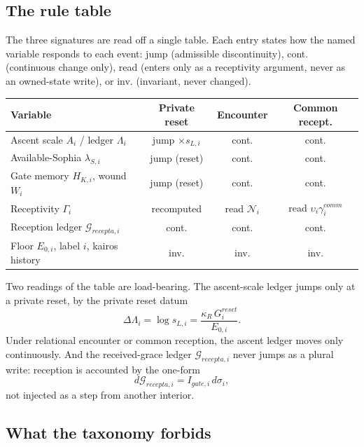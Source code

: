 \documentclass[11pt,a4paper]{article}
\def\mathrm#1{#1}%
\def\emph#1{#1}%
\renewcommand{\arraystretch}{1.25}
\theoremstyle{definition}
\theoremstyle{plain}
\theoremstyle{remark}
\begin{document}
\subsection{The rule table}

The three signatures are read off a single table. Each entry states how the named variable
responds to each event: \emph{jump} (admissible discontinuity), \emph{cont.} (continuous
change only), \emph{read} (enters only as a receptivity argument, never as an owned-state
write), or \emph{inv.} (invariant, never changed).

\begin{center}
\renewcommand{\arraystretch}{1.3}
\setlength{\tabcolsep}{5pt}
\footnotesize
\begin{tabular}{@{}l c c c@{}}
\hline
\textbf{Variable} & \textbf{Private reset} & \textbf{Encounter} & \textbf{Common recept.}\\
\hline
Ascent scale \(A_i\) / ledger \(\Lambda_i\)
& jump \(\times s_{L,i}\) & cont. & cont.\\
Available-Sophia \(\lambda_{S,i}\)
& jump (reset) & cont. & cont.\\
Gate memory \(H_{K,i}\), wound \(W_i\)
& jump (reset) & cont. & cont.\\
Receptivity \(\Gamma_i\)
& recomputed & read \(\mathcal N_i\) & read \(\upsilon_i\gamma_i^{\mathrm{comm}}\)\\
Reception ledger \(\mathcal G_{\mathrm{recepta},i}\)
& cont. & cont. & cont.\\
Floor \(E_{0,i}\), label \(i\), kairos history
& inv. & inv. & inv.\\
\hline
\end{tabular}
\end{center}

\noindent Two readings of the table are load-bearing. The ascent-scale ledger
jumps only at a private reset, by the private reset datum
\[
\Delta\Lambda_i=\log s_{L,i}
=
\frac{\kappa_R\,G_i^{\mathrm{reset}}}{E_{0,i}}.
\]
Under relational encounter or common reception, the ascent ledger moves only
continuously. And the received-grace ledger
\(\mathcal G_{\mathrm{recepta},i}\) never jumps as a plural write: reception is
accounted by the one-form
\[
d\mathcal G_{\mathrm{recepta},i}
=
I_{\mathrm{gate},i}\,d\sigma_i,
\]
not injected as a step from another interior.

\subsection{What the taxonomy forbids}
\end{document}
